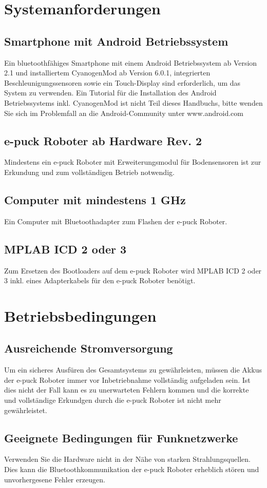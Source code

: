\documentclass[10pt,a4paper]{article}
\let\oldsection\section
\renewcommand{\section}{\newpage \oldsection}
\begin{document}
\section{Systemanforderungen}
		\subsection{Smartphone mit Android Betriebssystem} 
				Ein bluetoothf\"ahiges Smartphone mit einem Android Betriebssystem ab Version 2.1 und installiertem CyanogenMod ab Version 6.0.1, integrierten 
				Beschleunigungssensoren sowie ein Touch-Display sind erforderlich, um das System zu verwenden. Ein Tutorial f\"ur die Installation des Android 
				Betriebssystems inkl. CyanogenMod ist nicht Teil dieses Handbuchs, bitte wenden Sie sich im Problemfall an die Android-Community unter 
				www.android.com
		\subsection{e-puck Roboter ab Hardware Rev. 2} 
				Mindestens ein e-puck Roboter mit Erweiterungsmodul f\"ur Bodensensoren ist zur Erkundung und zum vollst\"andigen Betrieb notwendig.
		\subsection{Computer mit mindestens 1 GHz} 
				Ein Computer mit Bluetoothadapter zum Flashen der e-puck Roboter.
		\subsection{MPLAB ICD 2 oder 3} 
				Zum Ersetzen des Bootloaders auf dem e-puck Roboter wird MPLAB ICD 2 oder 3 inkl. eines Adapterkabels f\"ur den e-puck Roboter ben\"otigt.
\section{Betriebsbedingungen} 
		\subsection{Ausreichende Stromversorgung} 
				Um ein sicheres Ausf\"uren des Gesamtsystems zu gew\"ahrleisten, m\"ussen die Akkus der e-puck Roboter immer vor Inbetriebnahme vollst\"andig
				aufgeladen sein. Ist dies nicht der Fall kann es zu unerwarteten Fehlern kommen und die korrekte und vollst\"andige Erkundgen durch die e-puck Roboter
				ist nicht mehr gew\"ahrleistet.
		\subsection{Geeignete Bedingungen f\"ur Funknetzwerke} 
				Verwenden Sie die Hardware nicht in der N\"ahe von starken Strahlungsquellen. Dies kann die Bluetoothkommunikation der e-puck Roboter erheblich st\"oren 				und unvorhergesene Fehler erzeugen.
\end{document}
